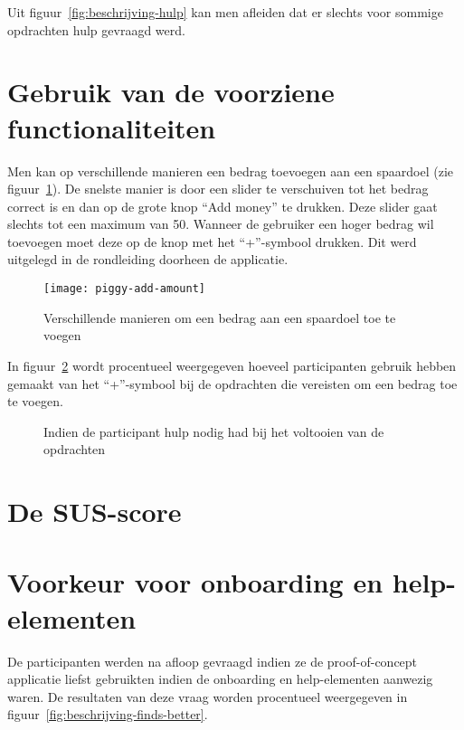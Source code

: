 Uit figuur~\ref{fig:beschrijving-hulp} kan men afleiden dat er slechts voor sommige opdrachten hulp gevraagd werd.

\section{Gebruik van de voorziene functionaliteiten}
\label{sec:gebruik-functionaliteiten}

Men kan op verschillende manieren een bedrag toevoegen aan een spaardoel (zie figuur~\ref{fig:piggy:add-amount}). De snelste manier is door een slider te verschuiven tot het bedrag correct is en dan op de grote knop ``Add money'' te drukken. Deze slider gaat slechts tot een maximum van 50. Wanneer de gebruiker een hoger bedrag wil toevoegen moet deze op de knop met het ``+''-symbool drukken. Dit werd uitgelegd in de rondleiding doorheen de applicatie.

\begin{figure}[h!]
    \centering
    \texttt{[image: piggy-add-amount]}
    \caption{Verschillende manieren om een bedrag aan een spaardoel toe te voegen}
    \label{fig:piggy:add-amount}
\end{figure}

In figuur~\ref{fig:beschrijving-plus} wordt procentueel weergegeven hoeveel participanten gebruik hebben gemaakt van het ``+''-symbool bij de opdrachten die vereisten om een bedrag toe te voegen.

\begin{figure}[h]
    \centering
    \qquad
    \caption{Indien de participant hulp nodig had bij het voltooien van de opdrachten}
    \label{fig:beschrijving-plus}
\end{figure}

\section{De SUS-score}
\label{sec:sus}

\section{Voorkeur voor onboarding en help-elementen}
\label{sec:voorkeur-onboarding}

De participanten werden na afloop gevraagd indien ze de proof-of-concept applicatie liefst gebruikten indien de onboarding en help-elementen aanwezig waren. De resultaten van deze vraag worden procentueel weergegeven in figuur~\ref{fig:beschrijving-finds-better}.

